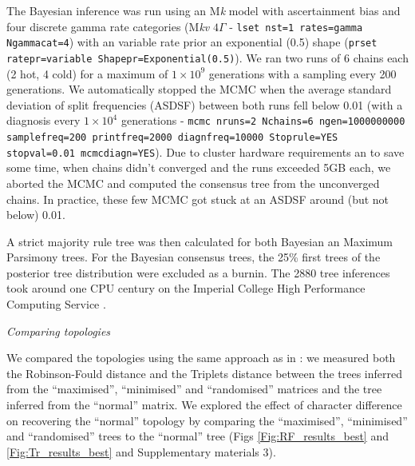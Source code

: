 \documentclass[12pt,letterpaper]{article}
\renewcommand{\subsection}[1]{%
\bigskip
\begin{center}
\begin{large}
\normalfont\itshape #1
\end{large}
\end{center}}
\begin{document}
The Bayesian inference was run using an M\textit{k} model with ascertainment bias and four discrete gamma rate categories (M\textit{kv} $4\Gamma$ - \texttt{lset nst=1 rates=gamma Ngammacat=4}) with an variable rate prior an exponential (0.5) shape (\texttt{prset ratepr=variable Shapepr=Exponential(0.5)}).
We ran two runs of 6 chains each (2 hot, 4 cold) for a maximum of $1\times10^9$ generations with a sampling every 200 generations.
We automatically stopped the MCMC when the average standard deviation of split frequencies (ASDSF) between both runs fell below 0.01 (with a diagnosis every $1\times10^4$ generations - \texttt{mcmc nruns=2 Nchains=6 ngen=1000000000 samplefreq=200 printfreq=2000 diagnfreq=10000 Stoprule=YES stopval=0.01 mcmcdiagn=YES}).
Due to cluster hardware requirements an to save some time, when chains didn't converged and the runs exceeded 5GB each, we aborted the MCMC and computed the consensus tree from the unconverged chains.
In practice, these few MCMC got stuck at an ASDSF around (but not below) 0.01.

A strict majority rule tree was then calculated for both Bayesian an Maximum Parsimony trees.
For the Bayesian consensus trees, the 25\% first trees of the posterior tree distribution were excluded as a burnin.
The 2880 tree inferences took around one CPU century on the Imperial College High Performance Computing Service \citep[2-3GHz clock rate;][]{HPC}.

\subsection{Comparing topologies}
We compared the topologies using the same approach as in \cite{Guillerme2016146}: we measured both the Robinson-Fould distance \citep{RF1981} and the Triplets distance \citep{dobson1975triplets} between the trees inferred from the ``maximised'', ``minimised'' and ``randomised'' matrices and the tree inferred from the ``normal'' matrix.
We explored the effect of character difference on recovering the ``normal'' topology by comparing the ``maximised'', ``minimised'' and ``randomised'' trees to the ``normal'' tree (Figs \ref{Fig:RF_results_best} and \ref{Fig:Tr_results_best} and Supplementary materials 3).
\end{document}
